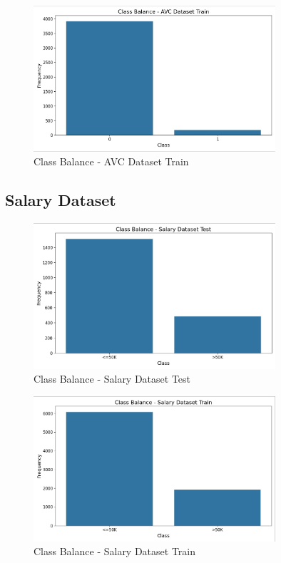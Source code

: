 \documentclass[a4paper,12pt]{article}
\begin{document}
\begin{figure}[h!]
    \centering
    \includegraphics[width=0.8\textwidth]{Resources/class_balance_avc_train.jpeg}
    \caption{Class Balance - AVC Dataset Train}
\end{figure}


\newpage

\subsection{Salary Dataset}
\begin{figure}[h!]
    \centering
    \includegraphics[width=0.8\textwidth]{Resources/class_balance_salary_test.jpeg}
    \caption{Class Balance - Salary Dataset Test}
\end{figure}

\begin{figure}[h!]
    \centering
    \includegraphics[width=0.8\textwidth]{Resources/class_balance_salary_train.jpeg}
    \caption{Class Balance - Salary Dataset Train}
\end{figure}
\end{document}
